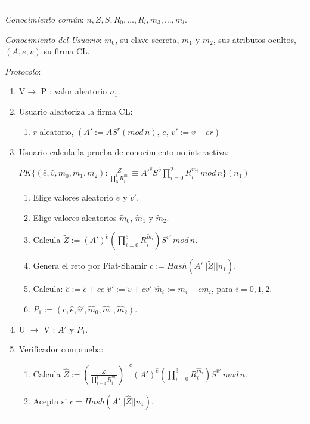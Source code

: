 \rule{\textwidth}{1pt}
\begin{algorithm}
	\hfil
	
	\textit{Conocimiento común}: $n,Z,S,R_0,\dots,R_{l},m_3,\dots,m_l$.
	
	\textit{Conocimiento del Usuario}: $m_0$, su clave secreta, $m_1$ y $m_2$, sus atributos ocultos, $(A,e,v)$ su firma CL.
	
	\hfil
	
	\textit{Protocolo}:
	\begin{enumerate}
		\item V$\rightarrow$ P : valor aleatorio $n_1$.
		
		\item Usuario aleatoriza la firma CL:
		\begin{enumerate}[label*=\arabic*.]
			
			\item $r$ aleatorio, $(A':=AS^{r} (mod\, n),\, e,\, v':=v-er)$
			
		\end{enumerate}
		
		\item Usuario calcula la prueba de conocimiento no interactiva:
		
		$PK\{ (\hat{e},\hat{v}, m_0, m_1, m_2) :  \frac{Z}{\prod_{3}^{l}R_i^{m_i}} \equiv A'^{\hat{e}} S^{\hat{v}}\prod_{i=0}^{2} R_i^{m_i} \, mod \, n  \}(n_1)$
		
		\begin{enumerate}[label*=\arabic*.]
			\item Elige valores aleatorio $\tilde{e}$ y $\tilde{v}'$.
			\item Elige valores aleatorios $\tilde{m}_0$, $\tilde{m}_1$ y $\tilde{m}_2$.
			\item Calcula $\tilde{Z}:=(A')^{\tilde{e}} \left( \prod_{i=0}^3 R_i^{\tilde{m}_i} \right) S^{\tilde{v}'} \, mod \, n $.
			\item Genera el reto por Fiat-Shamir $c:=Hash(A'||\tilde{Z}||n_1)$.
			\item Calcula:
			\subitem $\hat{e}:=\tilde{e}+ce$
			\subitem $\hat{v}':=\tilde{v}+cv'$
			\subitem $\hat{m}_i:=\tilde{m}_i+cm_i$, para $i=0,1,2$.
			\item $P_1:=(c, \hat{e}, \hat{v}', \hat{m}_0, \hat{m}_1, \hat{m}_2)$.			
		\end{enumerate}
		
		\item U $\rightarrow$ V : $A'$ y $P_1$.
		
		\item Verificador comprueba:
		 \begin{enumerate}[label*=\arabic*.]
		 	\item Calcula $\hat{Z}:= \left( \frac{Z}{\prod_{i=3}^{l} R_i^{m_i}} \right)^{-c} (A')^{\hat{e}} \left( \prod_{i=0}^{3} R_i^{\hat{m}_i} \right)  S^{\hat{v}'} \, mod \, n$.
		 	\item Acepta si $c=Hash(A'||\hat{Z}||n_1)$.
		 \end{enumerate}
		
	\end{enumerate}
	

\end{algorithm}
\rule{\textwidth}{1pt}


